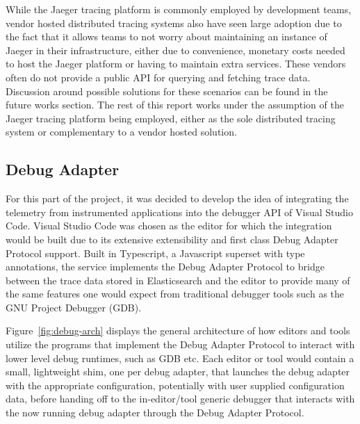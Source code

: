 \documentclass[12pt,pdftex,titlepage]{report}
\begin{document}
                    While the Jaeger tracing platform is commonly employed by development teams, vendor hosted distributed tracing systems also have seen large adoption due to the 
                    fact that it allows teams to not worry about maintaining an instance of Jaeger in their infrastructure, either due to convenience, monetary costs needed to host
                    the Jaeger platform or having to maintain extra services. These vendors often do not provide a public API for querying and fetching trace data. Discussion around
                    possible solutions for these scenarios can be found in the future works section. The rest of this report works under the assumption of the Jaeger tracing platform
                    being employed, either as the sole distributed tracing system or complementary to a vendor hosted solution. 

            \subsection{Debug Adapter}
                For this part of the project, it was decided to develop the idea of integrating the telemetry from instrumented applications into the debugger API of Visual Studio Code.
                Visual Studio Code was chosen as the editor for which the integration would be built due to its extensive extensibility and first class Debug Adapter Protocol support. 
                Built in Typescript, a Javascript superset with type annotations, the service implements the Debug Adapter Protocol to bridge between the trace data stored in Elasticsearch
                and the editor to provide many of the same features one would expect from traditional debugger tools such as the GNU Project Debugger (GDB).

                Figure~\ref{fig:debug-arch} displays the general architecture of how editors and tools utilize the programs that implement the Debug Adapter Protocol to interact with
                lower level debug runtimes, such as GDB etc. Each editor or tool would contain a small, lightweight shim, one per debug adapter, that launches the debug adapter with the
                appropriate configuration, potentially with user supplied configuration data, before handing off to the in-editor/tool generic debugger that interacts with the now running
                debug adapter through the Debug Adapter Protocol.
\end{document}
